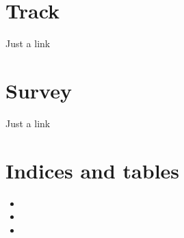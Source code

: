 \documentclass[letterpaper,10pt,english]{sphinxmanual}
\begin{document}
\chapter{Track}
\label{\detokenize{track:track}}\label{\detokenize{track::doc}}
\sphinxAtStartPar
Just a link

\sphinxstepscope


\chapter{Survey}
\label{\detokenize{survey:survey}}\label{\detokenize{survey::doc}}
\sphinxAtStartPar
Just a link


\chapter{Indices and tables}
\label{\detokenize{index:indices-and-tables}}\begin{itemize}
\item {} 
\sphinxAtStartPar
{}

\item {} 
\sphinxAtStartPar
{}

\item {} 
\sphinxAtStartPar
{}

\end{itemize}



\renewcommand{\indexname}{Index}
\printindex
\end{document}
